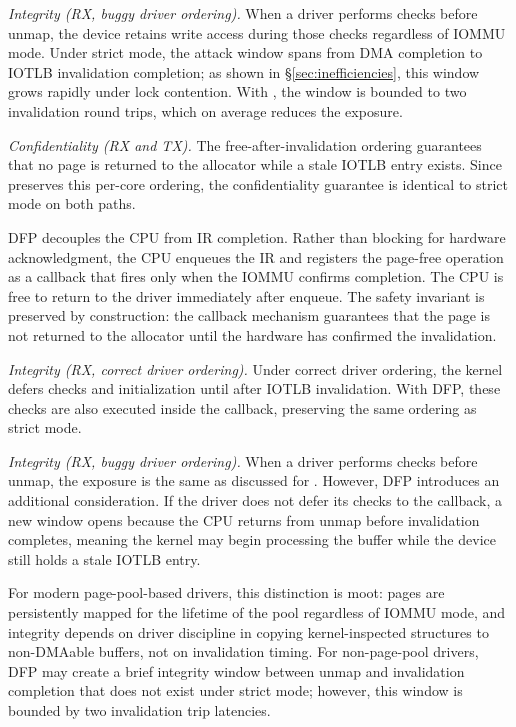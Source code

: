 \emph{Integrity (RX, buggy driver ordering).}
When a driver performs checks before unmap, the device retains write access during those checks regardless of IOMMU mode.
Under strict mode, the attack window spans from DMA completion to IOTLB invalidation completion; as shown in \S\ref{sec:inefficiencies}, this window grows rapidly under lock contention.
With \optOne, the window is bounded to two invalidation round trips, which on average reduces the exposure.

\emph{Confidentiality (RX and TX).}
The free-after-invalidation ordering guarantees that no page is returned to the allocator while a stale IOTLB entry exists.
Since \optOne preserves this per-core ordering, the confidentiality guarantee is identical to strict mode on both paths.
\fi

DFP decouples the CPU from IR completion. Rather than blocking for hardware acknowledgment, 
    the CPU enqueues the IR and registers the page-free operation 
    as a callback that fires only when the IOMMU confirms completion.
The CPU is free to return to the driver immediately after enqueue.
The safety invariant is preserved by construction: 
    the callback mechanism guarantees that the page is not returned to the allocator 
    until the hardware has confirmed the invalidation.


\emph{Integrity (RX, correct driver ordering).}
Under correct driver ordering, the kernel defers checks and initialization until after IOTLB invalidation.
With DFP, these checks are also executed inside the callback, preserving the same ordering as strict mode.

\emph{Integrity (RX, buggy driver ordering).}
When a driver performs checks before unmap, the exposure is the same as discussed for \optOne.
However, DFP introduces an additional consideration.
If the driver does not defer its checks to the callback, a new window opens because the CPU returns from unmap before invalidation completes, meaning the kernel may begin processing the buffer while the device still holds a stale IOTLB entry.

For modern page-pool-based drivers, this distinction is moot: pages are persistently mapped for the lifetime of the pool regardless of IOMMU mode, and integrity depends on driver discipline in copying kernel-inspected structures to non-DMAable buffers, not on invalidation timing.
For non-page-pool drivers, DFP may create a brief integrity window between unmap and invalidation completion that does not exist under strict mode; however, this window is bounded by two invalidation trip latencies.

